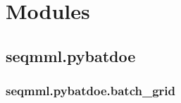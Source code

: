 \documentclass[letterpaper,10pt,english]{sphinxmanual}
\begin{document}
\section{Modules}
\label{\detokenize{modules:modules}}\label{\detokenize{modules::doc}}

\subsection{seqmml.pybatdoe}
\label{\detokenize{apidoc:seqmml-pybatdoe}}\label{\detokenize{apidoc::doc}}

\subsubsection{seqmml.pybatdoe.batch\_grid}
\label{\detokenize{apidoc:module-pybatdoe.batch_grid}}\label{\detokenize{apidoc:seqmml-pybatdoe-batch-grid}}
\end{document}
